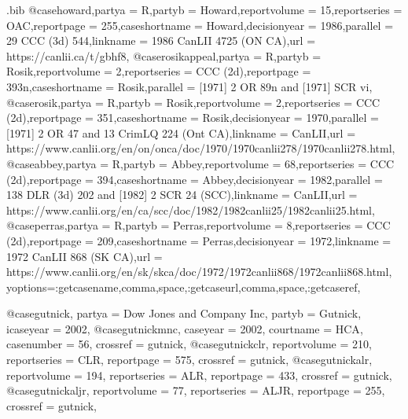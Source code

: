 \begin{filecontents*}[overwrite]{\jobname.bib}
@case{howard,partya = {R},partyb = {Howard},reportvolume = {15},reportseries = {OAC},reportpage = {255},caseshortname = {Howard},decisionyear = {1986},parallel = {29 CCC (3d) 544},linkname = {1986 CanLII 4725 (ON CA)},url = {https://canlii.ca/t/gbhf8},}
@case{rosikappeal,partya = {R},partyb = {Rosik},reportvolume = {2},reportseries = {CCC (2d)},reportpage = {393n},caseshortname = {Rosik},parallel = {[1971] 2 OR 89n and [1971] SCR vi},}
@case{rosik,partya = {R},partyb = {Rosik},reportvolume = {2},reportseries = {CCC (2d)},reportpage = {351},caseshortname = {Rosik},decisionyear = {1970},parallel = {[1971] 2 OR 47 and 13 CrimLQ 224 (Ont CA)},linkname = {CanLII},url = {https://www.canlii.org/en/on/onca/doc/1970/1970canlii278/1970canlii278.html},}
@case{abbey,partya = {R},partyb = {Abbey},reportvolume = {68},reportseries = {CCC (2d)},reportpage = {394},caseshortname = {Abbey},decisionyear = {1982},parallel = {138 DLR (3d) 202 and [1982] 2 SCR 24 (SCC)},linkname = {CanLII},url = {https://www.canlii.org/en/ca/scc/doc/1982/1982canlii25/1982canlii25.html},}
@case{perras,partya = {R},partyb = {Perras},reportvolume = {8},reportseries = {CCC (2d)},reportpage = {209},caseshortname = {Perras},decisionyear = {1972},linkname = {1972 CanLII 868 (SK CA)},url = {https://www.canlii.org/en/sk/skca/doc/1972/1972canlii868/1972canlii868.html},
yoptions={:getcasename,comma,space,:getcaseurl,comma,space,:getcaseref},}










@case{gutnick,
  partya = {Dow Jones and Company Inc}, 
  partyb = {Gutnick},
  icaseyear = {2002},
  }
@case{gutnickmnc,
  caseyear = {2002},
  courtname = {HCA},
  casenumber = {56},
  crossref = {gutnick},
  }
@case{gutnickclr,
  reportvolume = {210},
  reportseries = {CLR},
  reportpage = {575},
  crossref = {gutnick},
  }
@case{gutnickalr,
  reportvolume = {194},
  reportseries = {ALR},
  reportpage = {433},
  crossref = {gutnick},
  }
@case{gutnickaljr,
  reportvolume = {77},
  reportseries = {ALJR},
  reportpage = {255},
  crossref = {gutnick},
  }






\end{filecontents*}
